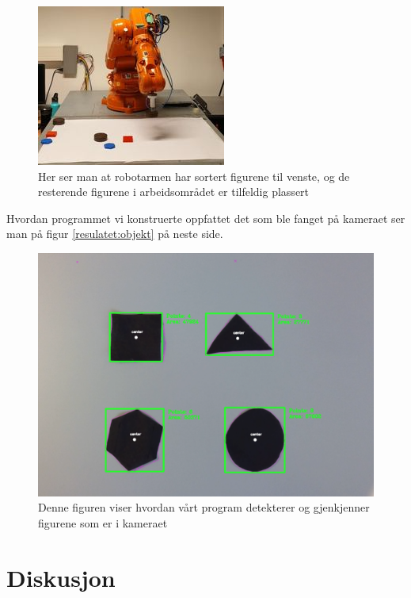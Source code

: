 \documentclass[conference]{IEEEtran}
\begin{document}
    \begin{figure}
        \centering
        \includegraphics[width = .8\linewidth]{images/sortering.jpg}
        \caption{Her ser man at robotarmen har sortert figurene til venste, og de resterende figurene i arbeidsområdet er tilfeldig plassert}
        \label{resultat:sortering}
    \end{figure}

    Hvordan programmet vi konstruerte oppfattet det som ble fanget på kameraet ser man på figur \ref{resulatet:objekt} på neste side.
    \begin{figure}[!htb]
        \centering
        \includegraphics[width=.8\linewidth]{images/objektene.png}
        \caption{Denne figuren viser hvordan vårt program detekterer og gjenkjenner figurene som er i kameraet}
        \label{resulat:objekt}
    \end{figure}

    
\section{Diskusjon}
\end{document}
